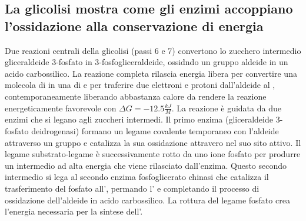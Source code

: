 \subsection{La glicolisi mostra come gli enzimi accoppiano l'ossidazione alla conservazione di energia}
Due reazioni centrali della glicolisi (passi 6 e 7) convertono lo zucchero intermedio gliceraldeide 3-fosfato in 3-fosfogliceraldeide, ossidndo un gruppo aldeide in un acido 
carbossilico. La reazione completa rilascia energia libera per convertire una molecola di  in una di  e per traferire due elettroni e protoni dall'aldeide al , 
contemporaneamente liberando abbastanza calore da rendere la reazione energeticamente favorevole con $\Delta G = -12.5\frac{kJ}{M}$. La reazione \`e guidata da due enzimi che si legano
agli zuccheri intermedi. Il primo enzima (gliceraldeide 3-fosfato deidrogenasi) formano un legame covalente temporaneo con l'aldeide attraverso un gruppo  e catalizza la sua
ossidazione attravero  nel suo sito attivo. Il legame substrato-legame \`e successivamente rotto da uno ione fosfato per produrre un intermedio ad alta energia che viene 
rilasciato dall'enzima. Questo secondo intermedio si lega al secondo enzima fosfoglicerato chinasi che catalizza il trasferimento del fosfato all', permando l' e 
completando il processo di ossidazione dell'aldeide in acido carbossilico. La rottura del legame fosfato crea l'energia necessaria per la sintese dell'. 
